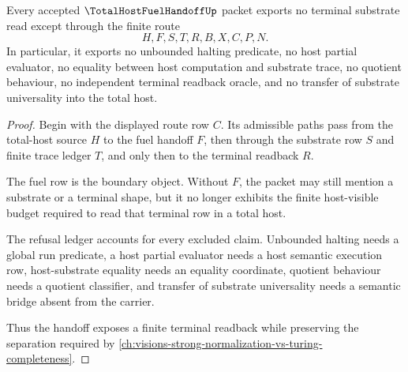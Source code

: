 \begin{theorem}
\label{thm:total-host-fuel-handoff-nonescape}
Every accepted $\TotalHostFuelHandoffUp$ packet exports no terminal substrate read except through the finite route
$$
H,F,S,T,R,B,X,C,P,N .
$$
In particular, it exports no unbounded halting predicate, no host partial evaluator, no equality between host computation and substrate trace, no quotient behaviour, no independent terminal readback oracle, and no transfer of substrate universality into the total host.
\end{theorem}
\begin{proof}
Begin with the displayed route row $C$. Its admissible paths pass from the total-host source $H$ to the fuel handoff $F$, then through the substrate row $S$ and finite trace ledger $T$, and only then to the terminal readback $R$.

The fuel row is the boundary object. Without $F$, the packet may still mention a substrate or a terminal shape, but it no longer exhibits the finite host-visible budget required to read that terminal row in a total host.

The refusal ledger accounts for every excluded claim. Unbounded halting needs a global run predicate, a host partial evaluator needs a host semantic execution row, host-substrate equality needs an equality coordinate, quotient behaviour needs a quotient classifier, and transfer of substrate universality needs a semantic bridge absent from the carrier.

Thus the handoff exposes a finite terminal readback while preserving the separation required by \autoref{ch:visions-strong-normalization-vs-turing-completeness}.
\end{proof}


